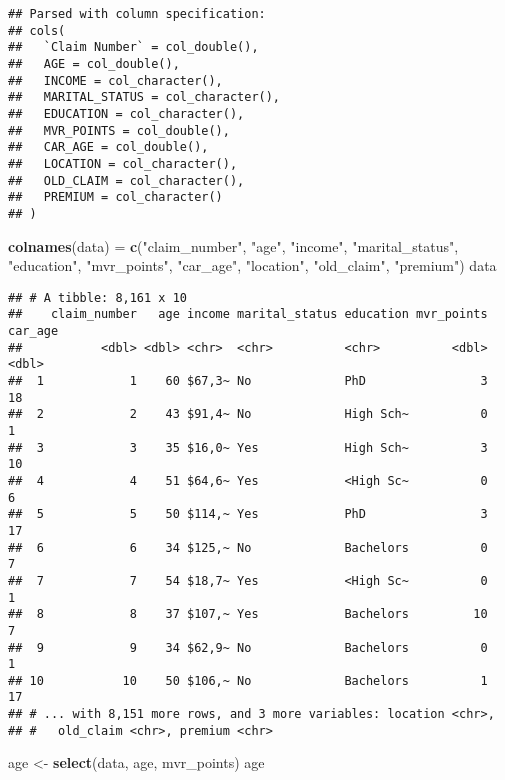 \documentclass[]{article}
\newenvironment{Shaded}{\begin{snugshade}}{\end{snugshade}}
\newcommand{\KeywordTok}[1]{\textcolor[rgb]{0.13,0.29,0.53}{\textbf{#1}}}
\newcommand{\StringTok}[1]{\textcolor[rgb]{0.31,0.60,0.02}{#1}}
\newcommand{\NormalTok}[1]{#1}
\begin{document}
\begin{verbatim}
## Parsed with column specification:
## cols(
##   `Claim Number` = col_double(),
##   AGE = col_double(),
##   INCOME = col_character(),
##   MARITAL_STATUS = col_character(),
##   EDUCATION = col_character(),
##   MVR_POINTS = col_double(),
##   CAR_AGE = col_double(),
##   LOCATION = col_character(),
##   OLD_CLAIM = col_character(),
##   PREMIUM = col_character()
## )
\end{verbatim}

\begin{Shaded}
\begin{Highlighting}[]
\KeywordTok{colnames}\NormalTok{(data) =}\StringTok{ }\KeywordTok{c}\NormalTok{(}\StringTok{"claim_number"}\NormalTok{, }\StringTok{"age"}\NormalTok{, }\StringTok{"income"}\NormalTok{, }\StringTok{"marital_status"}\NormalTok{, }\StringTok{"education"}\NormalTok{, }\StringTok{"mvr_points"}\NormalTok{, }\StringTok{"car_age"}\NormalTok{, }\StringTok{"location"}\NormalTok{, }\StringTok{"old_claim"}\NormalTok{, }\StringTok{"premium"}\NormalTok{)}
\NormalTok{data}
\end{Highlighting}
\end{Shaded}

\begin{verbatim}
## # A tibble: 8,161 x 10
##    claim_number   age income marital_status education mvr_points car_age
##           <dbl> <dbl> <chr>  <chr>          <chr>          <dbl>   <dbl>
##  1            1    60 $67,3~ No             PhD                3      18
##  2            2    43 $91,4~ No             High Sch~          0       1
##  3            3    35 $16,0~ Yes            High Sch~          3      10
##  4            4    51 $64,6~ Yes            <High Sc~          0       6
##  5            5    50 $114,~ Yes            PhD                3      17
##  6            6    34 $125,~ No             Bachelors          0       7
##  7            7    54 $18,7~ Yes            <High Sc~          0       1
##  8            8    37 $107,~ Yes            Bachelors         10       7
##  9            9    34 $62,9~ No             Bachelors          0       1
## 10           10    50 $106,~ No             Bachelors          1      17
## # ... with 8,151 more rows, and 3 more variables: location <chr>,
## #   old_claim <chr>, premium <chr>
\end{verbatim}

\begin{Shaded}
\begin{Highlighting}[]
\NormalTok{age <-}\StringTok{ }\KeywordTok{select}\NormalTok{(data, age, mvr_points)}
\NormalTok{age}
\end{Highlighting}
\end{Shaded}
\end{document}
